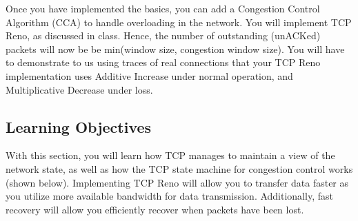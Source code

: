Once you have implemented the basics, you can add a Congestion Control Algorithm (CCA) to handle overloading in the network. You will implement TCP Reno, as discussed in class. Hence, the number of outstanding (unACKed) packets will now be be min(window size, congestion window size). You will have to demonstrate to us using traces of real connections that your TCP Reno implementation uses Additive Increase under normal operation, and Multiplicative Decrease under loss.

\subsection{Learning Objectives}
With this section, you will learn how TCP manages to maintain a view of the network state, as well as how the TCP state machine for congestion control works (shown below). Implementing TCP Reno will allow you to transfer data faster as you utilize more available bandwidth for data transmission. Additionally, fast recovery will allow you efficiently recover when packets have been lost. 


